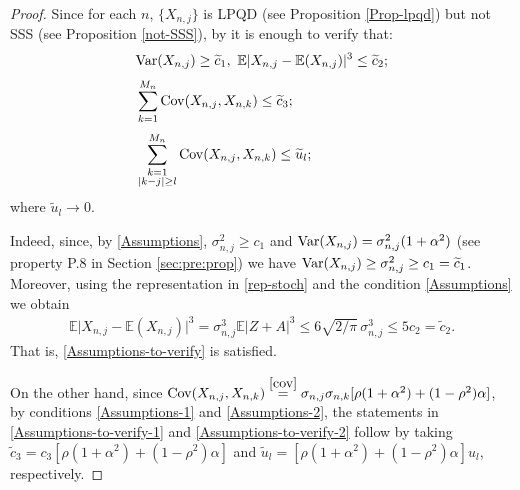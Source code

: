 \documentclass[12pt]{article}
\theoremstyle{definition}
\begin{document}
\begin{proof}
	Since for each $n$, $\{X_{n,j}\}$ is LPQD (see Proposition \ref{Prop-lpqd}) but not SSS (see Proposition \ref{not-SSS}),
by \cite{cox:02} it is enough to verify that:
\begin{align}
& {\rm Var}(X_{n,j})\geq \widetilde{c}_1, \ \mathbb{E}\vert X_{n,j}-\mathbb{E}(X_{n,j})\vert^3\leq \widetilde{c}_2; \label{Assumptions-to-verify}
\\[0,1cm]
& \sum_{k=1}^{M_n} {\rm Cov}(X_{n,j},X_{n,k})\leq \widetilde{c}_3; \label{Assumptions-to-verify-1}
\\[0,1cm]
&
\sum_{\substack{k=1 \\ \vert k-j\vert\geq l}}^{M_n} {\rm Cov}(X_{n,j},X_{n,k})\leq \widetilde{u}_l; \label{Assumptions-to-verify-2}
\end{align}
where  $\widetilde{u}_l \to 0$.

Indeed, since, by \eqref{Assumptions},  $\sigma^2_{n,j}\geq c_1$ and ${\rm Var}(X_{n,j})=\sigma^2_{n,j}(1+\alpha^2)$ (see property P.8 in Section \ref{sec:pre:prop}) we have ${\rm Var}(X_{n,j}) \geq\sigma^2_{n,j}\geq c_1=\widetilde{c}_1$. Moreover, using the representation in \eqref{rep-stoch} and the condition \eqref{Assumptions} we obtain 
\begin{align*}
\mathbb{E}\vert X_{n,j}-\mathbb{E}(X_{n,j})\vert^3
=
\sigma^3_{n,j}
  \mathbb{E}\vert Z+A\vert^3
  \leq 
  6\sqrt{2/\pi}\, \sigma^3_{n,j}
    \leq 
 5c_2=\widetilde{c}_2.
\end{align*}
That is, \eqref{Assumptions-to-verify} is satisfied.


On the other hand, since ${\rm Cov}(X_{n,j},X_{n,k})
\stackrel{\eqref{cov}}{=}
\sigma_{n,j}\sigma_{n,k}[
\rho(1+\alpha^2)+(1-\rho^2)\alpha]$, by conditions  \eqref{Assumptions-1} and \eqref{Assumptions-2}, the statements in 
\eqref{Assumptions-to-verify-1} and \eqref{Assumptions-to-verify-2} follow by taking $\widetilde{c}_3=c_3 [
\rho(1+\alpha^2)+(1-\rho^2)\alpha]$ and $\widetilde{u}_l= [
\rho(1+\alpha^2)+(1-\rho^2)\alpha] u_l$, respectively. 
\end{proof}
\end{document}
